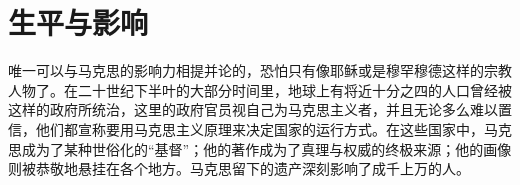 \chapter{生平与影响}
唯一可以与马克思的影响力相提并论的，恐怕只有像耶稣或是穆罕穆德这样的宗教人物了。在二十世纪下半叶的大部分时间里，地球上有将近十分之四的人口曾经被这样的政府所统治，这里的政府官员视自己为马克思主义者，并且无论多么难以置信，他们都宣称要用马克思主义原理来决定国家的运行方式。在这些国家中，马克思成为了某种世俗化的“基督”；他的著作成为了真理与权威的终极来源；他的画像则被恭敬地悬挂在各个地方。马克思留下的遗产深刻影响了成千上万的人。